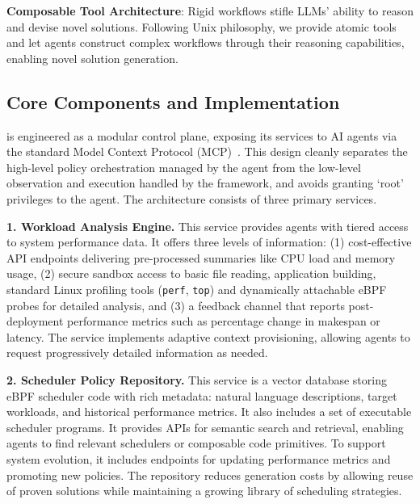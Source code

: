 \textbf{Composable Tool Architecture}: Rigid workflows stifle LLMs' ability to reason and devise novel solutions. Following Unix philosophy, we provide atomic tools and let agents construct complex workflows through their reasoning capabilities, enabling novel solution generation.

\subsection{Core Components and Implementation}
\sys is engineered as a modular control plane, exposing its services to AI agents via the standard Model Context Protocol (MCP)~\cite{anthropic2024mcp}. This design cleanly separates the high-level policy orchestration managed by the agent from the low-level observation and execution handled by the framework, and avoids granting `root' privileges to the agent. The architecture consists of three primary services.

\textbf{1. Workload Analysis Engine.} This service provides agents with tiered access to system performance data. It offers three levels of information: (1) cost-effective API endpoints delivering pre-processed summaries like CPU load and memory usage, (2) secure sandbox access to basic file reading, application building, standard Linux profiling tools (\texttt{perf}, \texttt{top}) and dynamically attachable eBPF probes for detailed analysis, and (3) a feedback channel that reports post-deployment performance metrics such as percentage change in makespan or latency. The service implements adaptive context provisioning, allowing agents to request progressively detailed information as needed.

\textbf{2. Scheduler Policy Repository.} This service is a vector database storing eBPF scheduler code with rich metadata: natural language descriptions, target workloads, and historical performance metrics. It also includes a set of executable scheduler programs. It provides APIs for semantic search and retrieval, enabling agents to find relevant schedulers or composable code primitives. To support system evolution, it includes endpoints for updating performance metrics and promoting new policies. The repository reduces generation costs by allowing reuse of proven solutions while maintaining a growing library of scheduling strategies.

